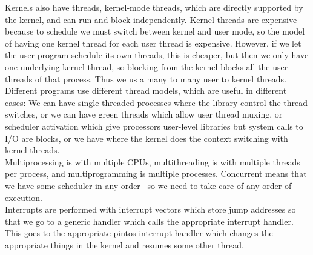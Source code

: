 \documentclass[paper=a4, fontsize=11pt]{scrartcl} %
\numberwithin{equation}{section} %
\numberwithin{figure}{section} %
\numberwithin{table}{section} %
\begin{document}
Kernels also have threads, kernel-mode threads, which are directly supported by the kernel, and can run and block independently. Kernel threads are expensive because to schedule we must switch between kernel and user mode, so the model of having one kernel thread for each user thread is expensive. However, if we let the user program schedule its own threads, this is cheaper, but then we only have one underlying kernel thread, so blocking from the kernel blocks all the user threads of that process. Thus we us a many to many user to kernel threads.\\
Different programs use different thread models, which are useful in different cases: We can have single threaded processes where the library control the thread switches, or we can have green threads which allow user thread muxing, or scheduler activation which give processors user-level libraries but system calls to I/O are blocks, or we have where the kernel does the context switching with kernel threads.\\
Multiprocessing is with multiple CPUs, multithreading is with multiple threads per process, and multiprogramming is multiple processes. Concurrent means that we have some scheduler in any order --so we need to take care of any order of execution.\\
Interrupts are performed with interrupt vectors which store jump addresses so that we go to a generic handler which calls the appropriate interrupt handler. This goes to the appropriate pintos interrupt handler which changes the appropriate things in the kernel and resumes some other thread. \\
\end{document}
